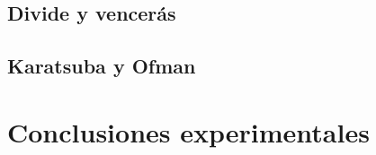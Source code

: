 \documentclass{article}
\begin{document}
\subsection{Divide y vencerás}

\subsection{Karatsuba y Ofman}

\section{Conclusiones experimentales}
\end{document}
